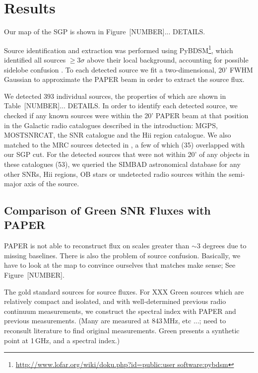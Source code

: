 \documentclass[useAMS,usenatbib]{mn2e}
\begin{document}
\section{Results}
\label{sec:res}

Our map of the SGP is shown in Figure~{\color{red}[NUMBER]... DETAILS}.

Source identification and extraction was performed using PyBDSM\footnote{\url{http://www.lofar.org/wiki/doku.php?id=public:user software:pybdsm}}, which identified all sources $\geq3\sigma$ above their local background, accounting for possible sidelobe confusion \citep{PyBDSM.15}. To each detected source we fit a two-dimensional, 20' FWHM Gaussian to approximate the PAPER beam \citep{Parsons.10} in order to extract the source flux. 

We detected $393$ individual sources, the properties of which are shown in Table~{\color{red}[NUMBER]... DETAILS}. In order to identify each detected source, we checked if any known sources were within the 20' PAPER beam at that position in the Galactic radio catalogues described in the introduction: MGPS, MOSTSNRCAT, the \cite{DAGreen.14} SNR catalogue and the \cite{Paladini.03} H{\sc ii} region catalogue. We also matched to the MRC sources detected in \cite{Jacobs.11}, a few of which (35) overlapped with our SGP cut. For the detected sources that were not within 20' of any objects in these catalogues (53), we queried the SIMBAD astronomical database \citep{Wegner.00} for any other SNRs,  H{\sc ii} regions, OB stars or undetected radio sources within the semi-major axis of the source.



\subsection{Comparison of Green SNR Fluxes with PAPER}

PAPER is not able to reconstruct flux on scales greater than $\sim3$
degrees due to missing baselines.  There is also the problem of source
confusion.  Basically, we have to look at the map to convince
ourselves that matches make sense; See Figure~{\color{red}[NUMBER]}.


{\color{red} The gold standard sources for source fluxes.}
For XXX Green sources which are relatively compact
and isolated, and with well-determined previous radio continuum
measurements, we construct the spectral index with PAPER and previous
measurements.  (Many are measured at 843\,MHz, etc ...; need to
reconsult literature to find original measurements.  Green presents a
synthetic point at 1\,GHz, and a spectral index.)
\end{document}
